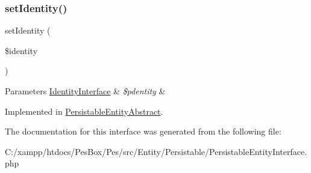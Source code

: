 \subsubsection{\texorpdfstring{set\+Identity()}{setIdentity()}}
{\footnotesize\ttfamily set\+Identity (\begin{DoxyParamCaption}\item[{\mbox{\hyperlink{interface_pes_1_1_entity_1_1_persistable_1_1_identity_interface}{Identity\+Interface}}}]{\$identity }\end{DoxyParamCaption})}


\begin{DoxyParams}[1]{Parameters}
\mbox{\hyperlink{interface_pes_1_1_entity_1_1_persistable_1_1_identity_interface}{Identity\+Interface}} & {\em \$pdentity} & \\
\hline
\end{DoxyParams}


Implemented in \mbox{\hyperlink{class_pes_1_1_entity_1_1_persistable_1_1_persistable_entity_abstract_a4b592a84880ccd2d9e5483195ca2fb71}{Persistable\+Entity\+Abstract}}.



The documentation for this interface was generated from the following file\+:\begin{DoxyCompactItemize}
\item 
C\+:/xampp/htdocs/\+Pes\+Box/\+Pes/src/\+Entity/\+Persistable/Persistable\+Entity\+Interface.\+php\end{DoxyCompactItemize}
